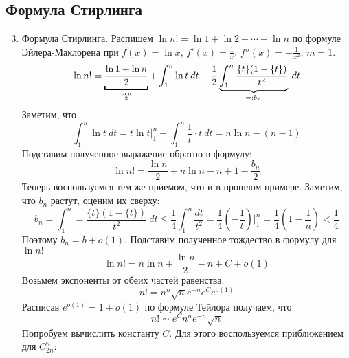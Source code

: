 \subsection{Формула Стирлинга}
\begin{enumerate}
    \setcounter{enumi}{2}
    \item Формула Стирлинга.  Распишем $\ln n! = \ln 1 + \ln 2 + \dotsb + \ln n$ по формуле Эйлера-Маклорена при $f(x) = \ln x, \, f'(x) = \frac{1}{x}, \, f''(x) = -\frac{1}{x^2}, \, m = 1$.
    \begin{equation*}
        \ln n! = \underbracket{\frac{\ln 1 + \ln n}{2}}_{\mathclap{\frac{\ln n}{2}}} +
        \int_{1}^{n} \ln t \: dt -
        \frac{1}{2}\underbrace{\int_{1}^{n} \frac{\{t\}(1 - \{t\})}{t^2}}_{\mathclap{=: b_n}} \: dt
    \end{equation*}
    Заметим, что
    \begin{equation*}
        \int_{1}^{n} \ln t \: dt = t\ln t \Big|_{1}^{n} - \int_{1}^{n} \frac{1}{t} \cdot t \: dt = n \ln n - (n - 1)
    \end{equation*}
    Подставим полученное выражение обратно в формулу:
    \begin{equation*}
        \ln n! = \frac{\ln n}{2} + n\ln n - n + 1 - \frac{b_n}{2}
    \end{equation*}
    Теперь воспользуемся тем же приемом, что и в прошлом примере. Заметим, что $b_n$ растут, оценим их сверху:
    \begin{equation*}
        b_n = \int_{1}^{n} = \frac{\{t\}(1 - \{t\})}{t^2} \: dt \leq
        \frac{1}{4} \int_{1}^{n} \frac{dt}{t^2} = \frac{1}{4}\left(-\frac{1}{t}\right)\Big|_{1}^{n} = \frac{1}{4}\left(1 - \frac{1}{n}\right) < \frac{1}{4}
    \end{equation*}
    Поэтому $b_n = b + o(1)$. Подставим полученное тождество в формулу для $\ln n!$
    \begin{equation*}
        \ln n! = n\ln n + \frac{\ln n}{2} - n + C + o(1)
    \end{equation*}
    Возьмем экспоненты от обеих частей равенства:
    \begin{equation*}
        n! = n^{n}\sqrt{n}e^{-n}e^{C}e^{o(1)}
    \end{equation*}
    Расписав $e^{o(1)} = 1 + o(1)$ по формуле Тейлора получаем, что
    \begin{equation*}
        n! \sim e^Cn^ne^{-n}\sqrt{n}
    \end{equation*}
    Попробуем вычислить константу $C$. Для этого воспользуемся приближением для $C_{2n}^{n}$:

\end{enumerate}
